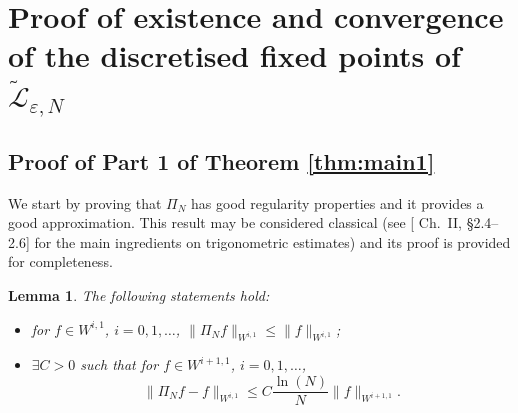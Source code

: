 \documentclass[12pt]{article}
\def\L{\mathcal{L}}
\newcommand{\eps}{\varepsilon}
\theoremstyle{plain}
\newtheorem{lemma}[theorem]{Lemma}
\begin{document}
\section{Proof of existence and convergence of the discretised fixed points of $\tilde{\L}_{\eps,N}$}
\subsection{Proof of Part 1 of Theorem \ref{thm:main1}}
\label{sec:thm21proof}
We start by proving that $\Pi_N$ has good regularity properties and it provides a good approximation. This result may be considered classical (see \cite{Zyg03}[ Ch.~II, \S 2.4--2.6] for the main ingredients on trigonometric estimates) and its proof is provided for completeness.
\begin{lemma}\label{lemkern}
The following statements hold:
\begin{itemize}
\item[1)] for $f \in W^{i,1}$, $i=0,1,\dots$, $\|\Pi_Nf\|_{W^{i,1}}\leq \|f\|_{W^{i,1}}$;
\item[2)] $\exists C>0$ such that for $f \in W^{i+1,1}$, $i=0,1,\dots$, $$\|\Pi_N f-f\|_{W^{i,1}}\leq C\frac{\ln(N)}{N}\|f\|_{W^{i+1,1}}.$$
\end{itemize} 
\end{lemma}
\end{document}

